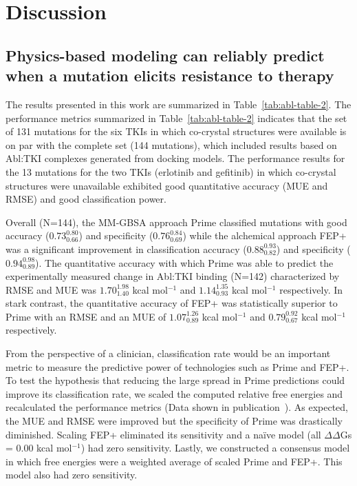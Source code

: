 \documentclass[phd,tocprelim]{cornell}
\begin{document}
\section{Discussion}

\subsection{Physics-based modeling can reliably predict when a mutation elicits resistance to therapy}
The results presented in this work are summarized in Table~\ref{tab:abl-table-2}.
The performance metrics summarized in Table~\ref{tab:abl-table-2} indicates that the set of 131 mutations for the six TKIs in which co-crystal structures were available is on par with the complete set (144 mutations), which included results based on Abl:TKI complexes generated from docking models.
The performance results for the 13 mutations for the two TKIs (erlotinib and gefitinib) in which co-crystal structures were unavailable exhibited good quantitative accuracy (MUE and RMSE) and good classification power.    

Overall (N=144), the MM-GBSA approach Prime classified mutations with good accuracy ($0.73^{0.80}_{0.66}$) and specificity ($0.76^{0.84}_{0.69}$)
while the alchemical approach FEP+ was a significant improvement in classification accuracy ($0.88^{0.93}_{0.82}$) and specificity ($0.94^{0.98}_{0.89}$).
The quantitative accuracy with which Prime was able to predict the experimentally measured change in Abl:TKI binding (N=142) characterized by RMSE and MUE was $1.70^{1.98}_{1.40}$ kcal mol$^{-1}$ and $1.14^{1.35}_{0.93}$ kcal mol$^{-1}$ respectively.
In stark contrast, the quantitative accuracy of FEP+ was statistically superior to Prime with an RMSE and an MUE of $1.07^{1.26}_{0.89}$ kcal mol$^{-1}$ and $0.79^{0.92}_{0.67}$ kcal mol$^{-1}$ respectively.

From the perspective of a clinician, classification rate would be an important metric to measure the predictive power of technologies such as Prime and FEP+. To test the hypothesis that reducing the large spread in Prime predictions could improve its classification rate, we scaled the computed relative free energies %
and recalculated the performance metrics (Data shown in publication~\citep{Hauser:2018vz}). As expected, the MUE and RMSE were improved but the specificity of Prime was drastically diminished. %
Scaling FEP+ eliminated its sensitivity and a na{\"i}ve model (all $\Delta\Delta$Gs = 0.00 kcal mol$^{-1}$) had zero sensitivity. Lastly, we constructed a consensus model in which free energies were a weighted average of scaled Prime and FEP+. This model also had zero sensitivity. %
\end{document}
